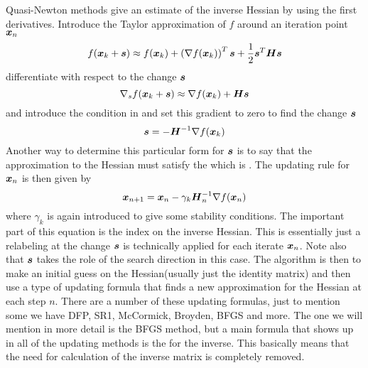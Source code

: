     Quasi-Newton methods give an estimate of the inverse Hessian by using the
    first derivatives. Introduce the Taylor approximation of $f$ around an
    iteration point $\boldsymbol{{x}}_n$
        \begin{equation}
            f(\boldsymbol{{x}}_k + \boldsymbol{{s}}) \approx f(\boldsymbol{{x}}_k) + \left(\nabla
            f(\boldsymbol{{x}}_k)\right)^T\boldsymbol{{s}} + \frac{1}{2}\boldsymbol{{s}}^T \boldsymbol{{H}}
            \boldsymbol{{s}}
        \end{equation}
    differentiate with respect to the change $\boldsymbol{{s}}$
        \begin{equation}
            \nabla_s f(\boldsymbol{{x}}_k + \boldsymbol{{s}}) \approx \nabla f(\boldsymbol{{x}}_k) +
            \boldsymbol{{H}}\boldsymbol{{s}}
            \label{eq:secantEquationNewton}
        \end{equation}
    and introduce the condition in  and set this
    gradient to zero to find the change $\boldsymbol{{s}}$
        \begin{equation}
            \boldsymbol{{s}} = -\boldsymbol{{H}}^{-1} \nabla f(\boldsymbol{{x}}_k)
        \end{equation}
    Another way to determine this particular form for $\boldsymbol{{s}}$ is to say that
    the approximation to the Hessian must satisfy the 
    which is . The updating rule for $\boldsymbol{{x}}_n$
    is then given by
        \begin{equation}
            \boldsymbol{{x}}_{n+1} = \boldsymbol{{x}}_n - \gamma_k\boldsymbol{{H}}^{-1}_n\nabla
            f(\boldsymbol{{x}}_n)
        \end{equation}
    where $\gamma_k$ is again introduced to give some stability conditions. The
    important part of this equation is the index on the inverse Hessian. This
    is essentially just a relabeling at the change $\boldsymbol{{s}}$ is technically
    applied for each iterate $\boldsymbol{{x}}_n$. Note also that $\boldsymbol{{s}}$ takes the
    role of the search direction in this case. The algorithm is then to make an
    initial guess on the Hessian(usually just the identity matrix) and then use
    a type of updating formula that finds a new approximation for the Hessian
    at each step $n$. There are a number of these updating formulas, just to
    mention some we have DFP, SR1, McCormick, Broyden, BFGS and more. The one
    we will mention in more detail is the BFGS method, but a main formula that
    shows up in all of the updating methods is the  for the inverse. This basically means that the need for
    calculation of the inverse matrix is completely removed. \\

